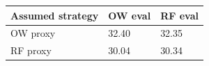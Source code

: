 \begin{tabular}{lll}
\hline
Assumed strategy & OW eval & RF eval \\
\hline
OW proxy & 32.40 & 32.35 \\
RF proxy & 30.04 & 30.34 \\
\hline
\end{tabular}
